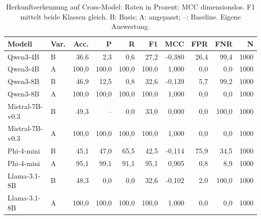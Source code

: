 \begin{table}[htbp]
\centering\scriptsize
\caption{Herkunftserkennung auf Cross-Model: Raten in Prozent; MCC dimensionslos. F1 mittelt beide Klassen gleich. B: Basis; A: angepasst; –: Baseline. Eigene Auswertung.}
\label{tab:result-origin-2}
\begin{tabular}{llrrrrrrrr}
\toprule
Modell & Var. & Acc. & P & R & F1 & MCC & FPR & FNR & N \\
\midrule
Qwen3-4B & B & 36{,}6 & 2{,}3 & 0{,}6 & 27{,}2 & -0{,}380 & 26{,}4 & 99{,}4 & 1000 \\
Qwen3-4B & A & 100{,}0 & 100{,}0 & 100{,}0 & 100{,}0 & 1{,}000 & 0{,}0 & 0{,}0 & 1000 \\
Qwen3-8B & B & 46{,}9 & 12{,}5 & 0{,}8 & 32{,}6 & -0{,}139 & 5{,}7 & 99{,}2 & 1000 \\
Qwen3-8B & A & 100{,}0 & 100{,}0 & 100{,}0 & 100{,}0 & 1{,}000 & 0{,}0 & 0{,}0 & 1000 \\
Mistral-7B-v0.3 & B & 49{,}3 & – & 0{,}0 & 33{,}0 & 0{,}000 & 0{,}0 & 100{,}0 & 1000 \\
Mistral-7B-v0.3 & A & 100{,}0 & 100{,}0 & 100{,}0 & 100{,}0 & 1{,}000 & 0{,}0 & 0{,}0 & 1000 \\
Phi-4-mini & B & 45{,}1 & 47{,}0 & 65{,}5 & 42{,}5 & -0{,}114 & 75{,}9 & 34{,}5 & 1000 \\
Phi-4-mini & A & 95{,}1 & 99{,}1 & 91{,}1 & 95{,}1 & 0{,}905 & 0{,}8 & 8{,}9 & 1000 \\
Llama-3.1-8B & B & 48{,}3 & 0{,}0 & 0{,}0 & 32{,}6 & -0{,}102 & 2{,}0 & 100{,}0 & 1000 \\
Llama-3.1-8B & A & 100{,}0 & 100{,}0 & 100{,}0 & 100{,}0 & 1{,}000 & 0{,}0 & 0{,}0 & 1000 \\
\bottomrule
\end{tabular}
\end{table}

